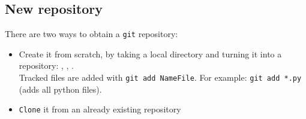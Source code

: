 \documentclass[../template.tex]{subfiles}
\begin{document}
\subsection{New repository}
There are two ways to obtain a \texttt{git} repository:
\begin{itemize}
    \item Create it from scratch, by taking a local directory and turning it into a repository:
    , , .\\
    Tracked files are added with \texttt{git add NameFile}. For example: \texttt{git add *.py} (adds all python files).
    \item \texttt{Clone} it from an already existing repository
\end{itemize}
\end{document}
